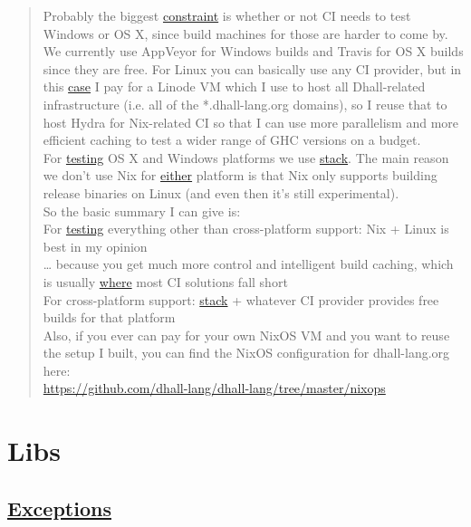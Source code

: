 \documentclass[a4paper,14pt,oneside]{book}
\begin{document}
\label{quote--gonzales-ci}
\begin{quote}
Probably the biggest \hyperref[org8973ad1]{constraint} is whether or not CI needs to test Windows or OS X, since build machines for those are harder to come by. We currently use AppVeyor for Windows builds and Travis for OS X builds since they are free. For Linux you can basically use any CI provider, but in this \hyperref[org7f69084]{case} I pay for a Linode VM which I use to host all Dhall-related infrastructure (i.e. all of the *.dhall-lang.org domains), so I reuse that to host Hydra for Nix-related CI so that I can use more parallelism and more efficient caching to test a wider range of GHC versions on a budget.\\

For \hyperref[orgaad6d96]{testing} OS X and Windows platforms we use \hyperref[orgc1beb4e]{stack}. The main reason we don't use Nix for \hyperref[org8c945e3]{either} platform is that Nix only supports building release binaries on Linux (and even then it's still experimental).\\

So the basic summary I can give is:\\

For \hyperref[orgaad6d96]{testing} everything other than cross-platform support: Nix + Linux is best in my opinion\\

\ldots{} because you get much more control and intelligent build caching, which is usually \hyperref[orgbd16902]{where} most CI solutions fall short\\

For cross-platform support: \hyperref[orgc1beb4e]{stack} + whatever CI provider provides free builds for that platform\\

Also, if you ever can pay for your own NixOS VM and you want to reuse the setup I built, you can find the NixOS configuration for dhall-lang.org here:\\

\url{https://github.com/dhall-lang/dhall-lang/tree/master/nixops}\\
\end{quote}

\part{Libs}
\label{sec:org5a510a6}
\chapter{\hyperref[org2122bf9]{Exceptions}}
\label{sec:org96cb6da}
\end{document}
